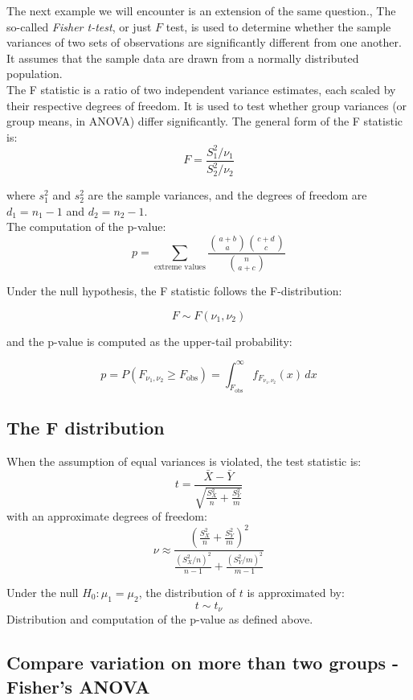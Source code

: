\documentclass{book}
\begin{document}
The next example we will encounter is an extension of the same question., The so-called \textit{Fisher t-test}, or just $F$ test, is used to determine whether the sample variances of two sets of observations are significantly different from one another. It assumes that the sample data are drawn from a normally distributed population.\\

The F statistic is a ratio of two independent variance estimates, each scaled by their respective degrees of freedom. It is used to test whether group variances (or group means, in ANOVA) differ significantly. The general form of the F statistic is:
\[
F = \frac{S_1^2 / \nu_1}{S_2^2 / \nu_2}
\]

where $s_1^{2}$ and $s_2^{2}$ are the sample variances, and the degrees of freedom are $d_1 = n_1 - 1$ and $d_2 = n_2 - 1$.\\

The computation of the p-value:
\[
p = \sum_{\text{extreme values}} \frac{\binom{a+b}{a} \binom{c+d}{c}}{\binom{n}{a+c}}
\]

Under the null hypothesis, the F statistic follows the F-distribution:

\[
F \sim F(\nu_1, \nu_2)
\]

and the p-value is computed as the upper-tail probability:

\[
p = P(F_{\nu_1, \nu_2} \geq F_{\text{obs}}) = \int_{F_{\text{obs}}}^{\infty} f_{F_{\nu_1, \nu_2}}(x)\,dx
\]

\subsection*{The F distribution}

When the assumption of equal variances is violated, the test statistic is:
\[
t = \frac{\bar{X} - \bar{Y}}{\sqrt{\frac{S_X^2}{n} + \frac{S_Y^2}{m}}}
\]
with an approximate degrees of freedom:
\[
\nu \approx \frac{\left(\frac{S_X^2}{n} + \frac{S_Y^2}{m}\right)^2}{\frac{(S_X^2/n)^2}{n - 1} + \frac{(S_Y^2/m)^2}{m - 1}}
\]

Under the null \( H_0: \mu_1 = \mu_2 \), the distribution of \( t \) is approximated by:
\[
t \sim t_{\nu}
\]
Distribution and computation of the p-value as defined above.

\newpage

\subsection{Compare variation on more than two groups - Fisher's ANOVA}
\end{document}
